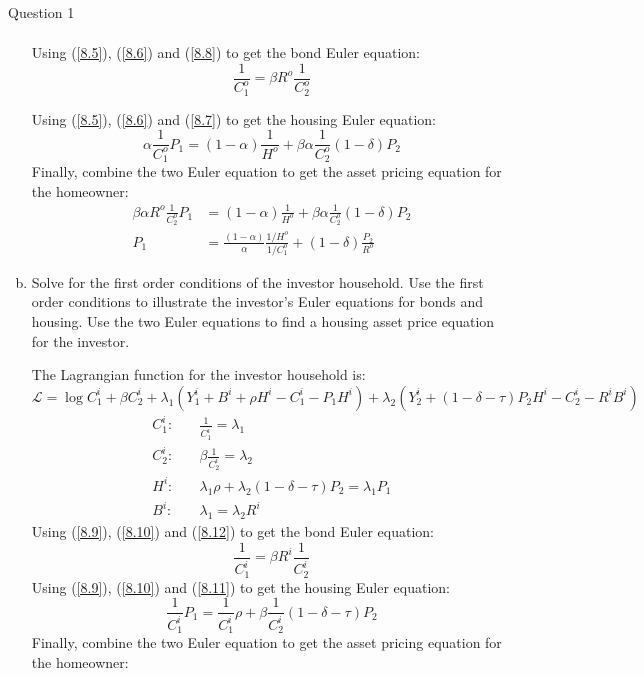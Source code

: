 \documentclass[a4paper]{article}
\newif\IfInSansMode
\begin{document}
\begin{questionbox}{Question 1}
\begin{enumerate}[(a)]
\begin{explanationbox}
\begin{align}
				\end{align}
				Using (\ref{8.5}), (\ref{8.6}) and (\ref{8.8}) to get the bond Euler equation:
				\[
					\frac{1}{C_1^o} = \beta R^o	\frac{1}{C_2^o}
				\]
			\end{explanationbox}
			\begin{explanationbox}
				Using (\ref{8.5}), (\ref{8.6}) and (\ref{8.7}) to get the housing Euler equation:
				\[
					\alpha\frac{1}{C_1^o} P_1 = (1-\alpha)\frac{1}{H^o}+\beta\alpha\frac{1}{C_2^o}(1-\delta)P_2
				\]
				Finally, combine the two Euler equation to get the asset pricing equation for the homeowner:
				\begin{align*}
					\beta\alpha R^o	\frac{1}{C_2^o} P_1 &= (1-\alpha)\frac{1}{H^o}+\beta\alpha\frac{1}{C_2^o}(1-\delta)P_2\\
					P_1 &= \frac{(1-\alpha)}{\alpha}\frac{1/H^o}{1/C_1^o}+(1-\delta)\frac{P_2}{R^o}
				\end{align*}
			\end{explanationbox}
			\item Solve for the first order conditions of the investor household. Use the first order conditions to illustrate the investor's Euler equations for bonds and housing. Use the two Euler equations to find a housing asset price equation for the investor.
			\begin{explanationbox}
			The Lagrangian function for the investor household is:
			\[
				\mathcal{L} = \log C_1^i + \beta C_2^i + \lambda_1(Y_1^i + B^i + \rho H^i - C_1^i - P_1 H^i) + \lambda_2( Y_2^i + (1-\delta-\tau)P_2H^i - C_2^i - R^iB^i)
			\]
			\begin{align}
				C_1^i:\quad &\frac{1}{C_1^i} = \lambda_1 \label{8.9}\\ 
				C_2^i:\quad &\beta\frac{1}{C_2^i} = \lambda_2 \label{8.10}\\ 
				H^i:\quad &\lambda_1\rho + \lambda_2(1-\delta-\tau)P_2 = \lambda_1P_1 \label{8.11}\\ 
				B^i:\quad &\lambda_1 = \lambda_2 R^i \label{8.12}
			\end{align}
			Using (\ref{8.9}), (\ref{8.10}) and (\ref{8.12}) to get the bond Euler equation:
			\[
				\frac{1}{C_1^i} = \beta R^i	\frac{1}{C_2^i}
			\]
			Using (\ref{8.9}), (\ref{8.10}) and (\ref{8.11}) to get the housing Euler equation:
			\[
				\frac{1}{C_1^i} P_1 = \frac{1}{C_1^i}\rho + \beta\frac{1}{C_2^i}(1-\delta-\tau)P_2
			\]
			Finally, combine the two Euler equation to get the asset pricing equation for the homeowner:
			\begin{align*}

\end{align*}
\end{explanationbox}
\end{enumerate}
\end{questionbox}
\end{document}
